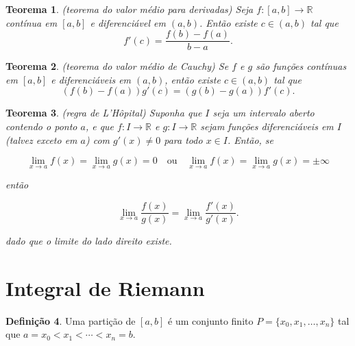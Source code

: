 \documentclass[12pt]{article}
\theoremstyle{plain}
\newtheorem{thm}{Teorema}[section]
\theoremstyle{definition}
\newtheorem{defn}[thm]{Definição}
\theoremstyle{remark}
\begin{document}
\begin{thm} (teorema do valor médio para derivadas)
    Seja \(f : [a, b] \to \mathbb{R}\) contínua em \([a, b]\) e diferenciável em \((a, b)\). Então existe \(c \in (a, b)\) tal que
    \begin{equation}
        f'(c) = \frac{f(b) - f(a)}{b - a}.
    \end{equation}
\end{thm}

\begin{thm} (teorema do valor médio de Cauchy)
    Se \(f\) e \(g\) são funções contínuas em \([a, b]\) e diferenciáveis em \((a, b)\), então existe \(c \in (a, b)\) tal que
    \begin{equation}
        (f(b) - f(a)) g'(c) = (g(b) - g(a)) f'(c).
    \end{equation}
\end{thm}

\begin{thm} (regra de L'Hôpital)
    Suponha que \(I\) seja um intervalo aberto contendo o ponto \(a\), e que \(f : I \to \mathbb{R}\) e \(g : I \to \mathbb{R}\) sejam funções diferenciáveis em \(I\) (talvez exceto em \(a\)) com \(g'(x) \neq 0\) para todo \(x \in I\). Então, se

    \begin{equation*}
        \lim_{x \to a} f(x) = \lim_{x \to a} g(x) = 0 \quad \text{ou} \quad \lim_{x \to a} f(x) = \lim_{x \to a} g(x) = \pm \infty
    \end{equation*}

    \noindent então 

    \begin{equation}
        \lim_{x \to a} \frac{f(x)}{g(x)} = \lim_{x \to a} \frac{f'(x)}{g'(x)}.
    \end{equation}

    \noindent dado que o limite do lado direito existe.

\end{thm}

\newpage

\section{Integral de Riemann}

\begin{defn}
    Uma partição de \([a,b]\) é um conjunto finito \(P = \{x_0, x_1, \ldots, x_n\}\) tal que \(a = x_0 < x_1 < \cdots < x_n = b\).
\end{defn}
\end{document}
